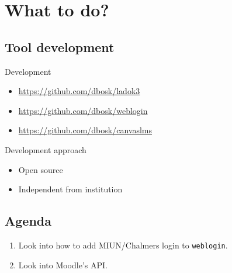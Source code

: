 \section{What to do?}

\subsection{Tool development}

\begin{frame}[fragile]
  \begin{block}{Development}
    \begin{itemize}
      \item \url{https://github.com/dbosk/ladok3}
      \item \url{https://github.com/dbosk/weblogin}
      \item \url{https://github.com/dbosk/canvaslms}
    \end{itemize}
  \end{block}

  \begin{block}{Development approach}
    \begin{itemize}
      \item Open source
      \item Independent from institution
    \end{itemize}
  \end{block}
\end{frame}

\subsection{Agenda}

\begin{frame}
  \begin{enumerate}
    \item Look into how to add MIUN/Chalmers login to \texttt{weblogin}.
    \item Look into Moodle's API.
  \end{enumerate}
\end{frame}
